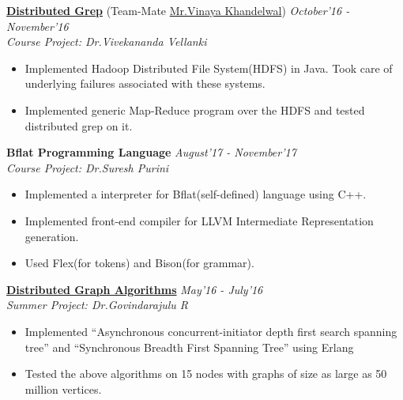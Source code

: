 \documentclass[10pt]{article}
\newenvironment{changemargin}[2]{%
    \begin{list}{}{%
            \setlength{\topsep}{0pt}%
            \setlength{\leftmargin}{#1}%
            \setlength{\rightmargin}{#2}%
            \setlength{\listparindent}{\parindent}%
        \setlength{\itemindent}{\parindent}%
            \setlength{\parsep}{\parskip}%
        }%
\item[]}{\end{list}
}
\newenvironment{body} {
    \vspace*{-16pt}
    \begin{changemargin}{-0.6in}{-0.65in}
    }   
    {\end{changemargin}
}
\begin{document}
\begin{body}
     \href{https://github.com/mayukuse24/HDFS}{\textbf{Distributed Grep}} (Team-Mate \href{https://github.com/mayukuse24}{Mr.Vinaya Khandelwal}) \hfill \emph{October'16 - November'16}\\
     \emph{Course Project: Dr.Vivekananda Vellanki}\\
     \begin{itemize}
         \item{Implemented Hadoop Distributed File System(HDFS) in Java. Took care of underlying failures associated with these systems.}
         \item{Implemented generic Map-Reduce program over the HDFS and tested distributed grep on it.}
     \end{itemize}
     \smallskip
  
     \textbf{Bflat Programming Language} \hfill \emph{August'17 - November'17}\\
     \emph{Course Project: Dr.Suresh Purini}
     \begin{itemize}
         \item{Implemented a interpreter for Bflat(self-defined) language using C++.}
         \item{Implemented front-end compiler for LLVM Intermediate Representation generation.}
         \item{Used Flex(for tokens) and Bison(for grammar).}
     \end{itemize}
     \smallskip

     \href{https://researchweb.iiit.ac.in/~shaleen.garg/files/Summer2.pdf}{\textbf{Distributed Graph Algorithms}} \hfill \emph{May'16 - July'16}\\
     \emph{Summer Project: Dr.Govindarajulu R}
     \begin{itemize}
         \item {Implemented ``Asynchronous concurrent-initiator depth first search spanning tree'' and ``Synchronous Breadth First Spanning Tree'' using Erlang}
         \item {Tested the above algorithms on 15 nodes with graphs of size as large as 50 million vertices.}
     \end{itemize}
     \smallskip
\end{body}
\end{document}
